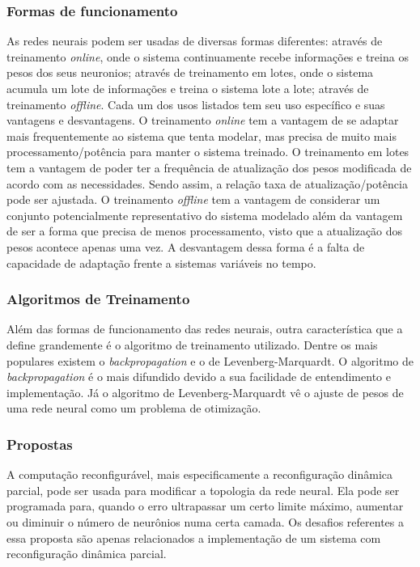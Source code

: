 \documentclass[11pt,a4paper,oneside]{book}
\begin{document}
\subsubsection{Formas de funcionamento}
As redes neurais podem ser usadas de diversas formas diferentes: atrav\'es de treinamento \textit{online}, onde o sistema continuamente recebe informa\c{c}\~oes e treina os pesos dos seus neuronios; atrav\'es de treinamento em lotes, onde o sistema acumula um lote de informa\c{c}\~oes e treina o sistema lote a lote; atrav\'es de treinamento \textit{offline}.
Cada um dos usos listados tem seu uso específico e suas vantagens e desvantagens.
O treinamento \textit{online} tem a vantagem de se adaptar mais frequentemente ao sistema que tenta modelar, mas precisa de muito mais processamento/potência para manter o sistema treinado.
O treinamento em lotes tem a vantagem de poder ter a frequência de atualiza\c{c}\~ao dos pesos modificada de acordo com as necessidades.
Sendo assim, a rela\c{c}\~ao taxa de atualiza\c{c}\~ao/potência pode ser ajustada.
O treinamento \textit{offline} tem a vantagem de considerar um conjunto potencialmente representativo do sistema modelado al\'em da vantagem de ser a forma que precisa de menos processamento, visto que a atualiza\c{c}\~ao dos pesos acontece apenas uma vez.
A desvantagem dessa forma \'e a falta de capacidade de adapta\c{c}\~ao frente a sistemas vari\'aveis no tempo.

\subsubsection{Algoritmos de Treinamento}
Al\'em das formas de funcionamento das redes neurais, outra característica que a define grandemente \'e o algoritmo de treinamento utilizado.
Dentre os mais populares existem o \textit{backpropagation} e o de Levenberg-Marquardt.
O algoritmo de \textit{backpropagation} \'e o mais difundido devido a sua facilidade de entendimento e implementa\c{c}\~ao.
J\'a o algoritmo de Levenberg-Marquardt vê o ajuste de pesos de uma rede neural como um problema de otimiza\c{c}\~ao.

\subsubsection{Propostas}
A computa\c{c}\~ao reconfigur\'avel, mais especificamente a reconfigura\c{c}\~ao dinâmica parcial, pode ser usada para modificar a topologia da rede neural.
Ela pode ser programada para, quando o erro ultrapassar um certo limite m\'aximo, aumentar ou diminuir o n\'umero de neur\^onios numa certa camada.
Os desafios referentes a essa proposta s\~ao apenas relacionados a implementa\c{c}\~ao de um sistema com reconfigura\c{c}\~ao dinâmica parcial.
\end{document}
